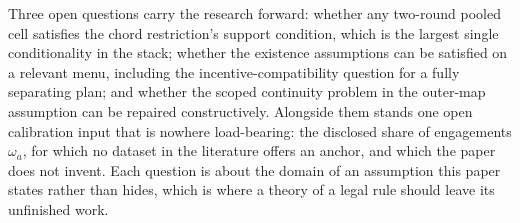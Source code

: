 \documentclass[11pt]{article}
\begin{document}
Three open questions carry the research forward: whether any two-round pooled cell satisfies the
chord restriction's support condition, which is the largest single conditionality in the stack;
whether the existence assumptions can be satisfied on a relevant menu, including the
incentive-compatibility question for a fully separating plan; and whether the scoped continuity
problem in the outer-map assumption can be repaired constructively. Alongside them stands one open
calibration input that is nowhere load-bearing: the disclosed share of engagements $\omega_a$, for which no
dataset in the literature offers an anchor, and which the paper does not invent. Each question is
about the domain of an assumption
this paper states rather than hides, which is where a theory of a legal rule should leave its
unfinished work.

\printbibliography
\end{document}
